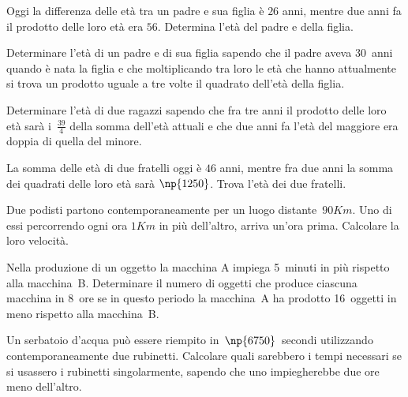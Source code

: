 \begin{multicols}{2}
\begin{esercizio}[\Ast]
 \label{ese:6.71}
Oggi la differenza delle età tra un padre e sua figlia è $ 26 $ anni, mentre due anni fa il prodotto delle loro età era $ 56 $. Determina l'età del padre e della figlia.
\end{esercizio}

\begin{esercizio}[\Ast]
 \label{ese:6.72}
Determinare l'età di un padre e di sua figlia sapendo che il padre aveva $30$~anni quando è nata la figlia e che moltiplicando tra loro le età che hanno attualmente si trova un prodotto uguale a tre volte il quadrato dell'età della figlia.
\end{esercizio}

\begin{esercizio}[\Ast]
 \label{ese:6.73}
Determinare l'età di due ragazzi sapendo che fra tre anni il prodotto delle loro età sarà i~$\frac{39}{4}$ della somma dell'età attuali e che due anni fa l'età del maggiore era doppia di quella del minore.
\end{esercizio}

\begin{esercizio}[\Ast]
 \label{ese:6.74}
La somma delle età di due fratelli oggi è $46$ anni, mentre fra due anni la somma dei quadrati delle loro età sarà $\np{1250}$. Trova l'età dei due fratelli.
\end{esercizio}

\begin{esercizio}[\Ast]
 \label{ese:6.75}
Due podisti partono contemporaneamente per un luogo distante~$90\unit{Km}$. Uno di essi percorrendo ogni ora $1\unit{Km}$ in più dell'altro, arriva un'ora prima. Calcolare la loro velocità.
\end{esercizio}

\begin{esercizio}[\Ast]
 \label{ese:6.76}
Nella produzione di un oggetto la macchina A impiega 5~minuti in più rispetto alla macchina~B. Determinare il numero di oggetti che produce ciascuna macchina in 8~ore se in questo periodo la macchina~A ha prodotto 16~oggetti in meno rispetto alla macchina~B.
\end{esercizio}

\begin{esercizio}[\Ast]
 \label{ese:6.77}
Un serbatoio d'acqua può essere riempito in~$\np{6750}$~secondi utilizzando contemporaneamente due rubinetti. Calcolare quali sarebbero i tempi necessari se si usassero i rubinetti singolarmente, sapendo che uno impiegherebbe due ore meno dell'altro.
\end{esercizio}


\end{multicols}
